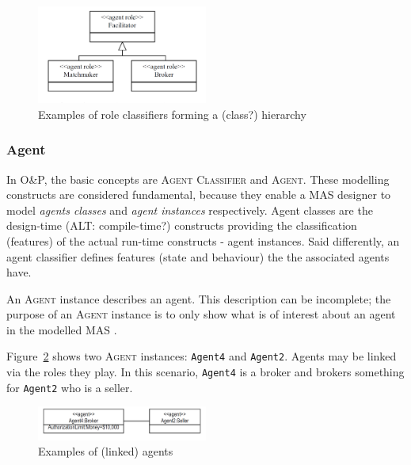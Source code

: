 \begin{figure}[ht]
	\centering
	\includegraphics[width=0.5\textwidth]{images/onp-role-classifier-examples.png}
	\caption{Examples of role classifiers forming a (class?) hierarchy}
	\label{figure:onp-role-classifier-examples}
\end{figure}

\subsubsection*{Agent}

In O\&P, the basic concepts are \textsc{Agent Classifier} and \textsc{Agent}.
These modelling constructs are considered fundamental, because they enable a MAS designer to model \textit{agents classes} and \textit{agent instances} respectively.
Agent classes are the design-time (ALT: compile-time?) constructs providing the classification (features) of the actual run-time constructs - agent instances.
Said differently, an agent classifier defines features (state and behaviour) the the associated agents have. 

An \textsc{Agent} instance describes an agent.
This description can be incomplete; the purpose of an \textsc{Agent} instance is to only show what is of interest about an agent in the modelled MAS \cite{Odell05}.

Figure~\ref{figure:onp-agent-examples} shows two \textsc{Agent} instances: \texttt{Agent4} and \texttt{Agent2}.
Agents may be linked via the roles they play.
In this scenario, \texttt{Agent4} is a broker and brokers something for \texttt{Agent2} who is a seller.

\begin{figure}[ht]
	\centering
	\includegraphics[width=0.5\textwidth]{images/onp-agent-examples.png}
	\caption{Examples of (linked) agents}
	\label{figure:onp-agent-examples}
\end{figure}

